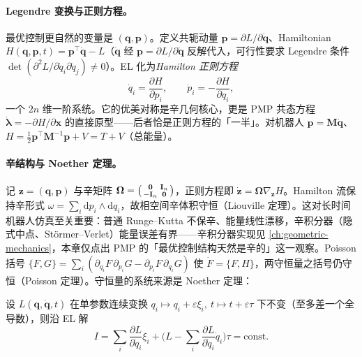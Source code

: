 \paragraph{Legendre 变换与正则方程。}
最优控制更自然的变量是 $(\mathbf q,\mathbf p)$。定义共轭动量 $\mathbf p=\partial L/\partial\dot{\mathbf q}$、Hamiltonian $H(\mathbf q,\mathbf p,t)=\mathbf p^\top\dot{\mathbf q}-L$（$\dot{\mathbf q}$ 经 $\mathbf p=\partial L/\partial\dot{\mathbf q}$ 反解代入，可行性要求 Legendre 条件 $\det(\partial^2 L/\partial\dot q_i\partial\dot q_j)\ne0$）。EL 化为\emph{Hamilton 正则方程}
\begin{equation}
  \dot q_i=\frac{\partial H}{\partial p_i},\qquad \dot p_i=-\frac{\partial H}{\partial q_i},
  \label{eq:pmp-canonical}
\end{equation}
一个 $2n$ 维一阶系统。它的优美对称是辛几何核心，更是 PMP 共态方程 $\dot{\boldsymbol\lambda}=-\partial H/\partial\mathbf x$ 的直接原型——后者恰是正则方程的「一半」。对机器人 $\mathbf p=\mathbf M\dot{\mathbf q}$、$H=\tfrac12\mathbf p^\top\mathbf M^{-1}\mathbf p+V=T+V$（总能量）。

\paragraph{辛结构与 Noether 定理。}
记 $\mathbf z=(\mathbf q,\mathbf p)$ 与辛矩阵 $\boldsymbol\Omega=\begin{psmallmatrix}\mathbf 0&\mathbf I_n\\-\mathbf I_n&\mathbf 0\end{psmallmatrix}$，正则方程即 $\dot{\mathbf z}=\boldsymbol\Omega\nabla_{\mathbf z}H$。Hamilton 流保持辛形式 $\omega=\sum_i\mathrm dp_i\wedge\mathrm dq_i$，故相空间辛体积守恒（Liouville 定理）。这对长时间机器人仿真至关重要：普通 Runge--Kutta 不保辛、能量线性漂移，辛积分器（隐式中点、Störmer--Verlet）能量误差有界——辛积分器实现见 \cref{ch:geometric-mechanics}，本章仅点出 PMP 的「最优控制结构天然是辛的」这一观察。Poisson 括号 $\{F,G\}=\sum_i(\partial_{q_i}F\,\partial_{p_i}G-\partial_{p_i}F\,\partial_{q_i}G)$ 使 $\dot F=\{F,H\}$，两守恒量之括号仍守恒（Poisson 定理）。守恒量的系统来源是 Noether 定理：

\begin{theorem}[Noether 定理]\label{thm:pmp-noether}
设 $L(\mathbf q,\dot{\mathbf q},t)$ 在单参数连续变换 $q_i\mapsto q_i+\varepsilon\xi_i,\ t\mapsto t+\varepsilon\tau$ 下不变（至多差一个全导数），则沿 EL 解
\begin{equation}
  I=\sum_i\frac{\partial L}{\partial\dot q_i}\xi_i+\Big(L-\sum_i\frac{\partial L}{\partial\dot q_i}\dot q_i\Big)\tau=\text{const}.
  \label{eq:pmp-noether}
\end{equation}
\end{theorem}

